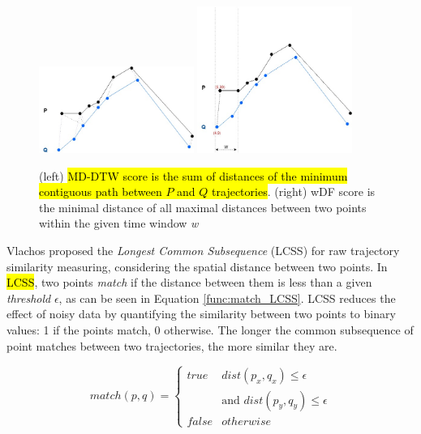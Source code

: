 \documentclass[12pt]{article}
\begin{document}
\begin{figure}[h]
\centering
\includegraphics[width=0.45\textwidth]{Related_Works/related_trajes-DTW.jpg}
\includegraphics[width=0.45\textwidth]{Related_Works/related_trajes-wDF.jpg}
\caption{\label{fig:related_trajes_wDF_DTW}(left) \hl{MD-DTW score is the sum of distances of the minimum contiguous path between $P$ and $Q$ trajectories}. (right) wDF score is the minimal distance of all maximal distances between two points within the given time window \textit{w}}
\end{figure}

Vlachos \cite{vlachos2002discovering} proposed the \emph{Longest Common Subsequence} (LCSS) for raw trajectory similarity measuring, considering the spatial distance between two points. In \hl{LCSS}, two points \textit{match} if the distance between them is less than a given \textit{threshold} $\epsilon$, as can be seen in Equation \ref{func:match_LCSS}. LCSS reduces the effect of noisy data by quantifying the similarity between two points to binary values: 1 if the points match, 0 otherwise. The longer the common subsequence of point matches between two trajectories, the more similar they are. 


\begin{equation}
\label{func:match_LCSS}
  match(p, q) = 
  \begin{cases} 
      true & dist(p_x, q_x)  \leq \epsilon\\ 
        &            \text{and } dist(p_y, q_y)  \leq \epsilon\\
      false & otherwise
  \end{cases}
\end{equation}
\end{document}
